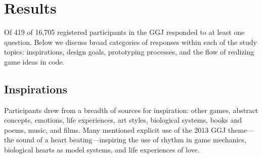 \documentclass{sig-alternate}
\begin{document}
\section{Results}
Of 419 of 16,705 registered participants in the GGJ responded to at least one question.
Below we discuss broad categories of responses within each of the study topics: inspirations, design goals, prototyping processes, and the flow of realizing game ideas in code.



\subsection{Inspirations}
Participants drew from a breadth of sources for inspiration: other games, abstract concepts, emotions, life experiences, art styles, biological systems, books and poems, music, and films. Many mentioned explicit use of the 2013 GGJ theme---the sound of a heart beating---inspiring the use of rhythm in game mechanics, biological hearts as model systems, and life experiences of love. 


\end{document}
